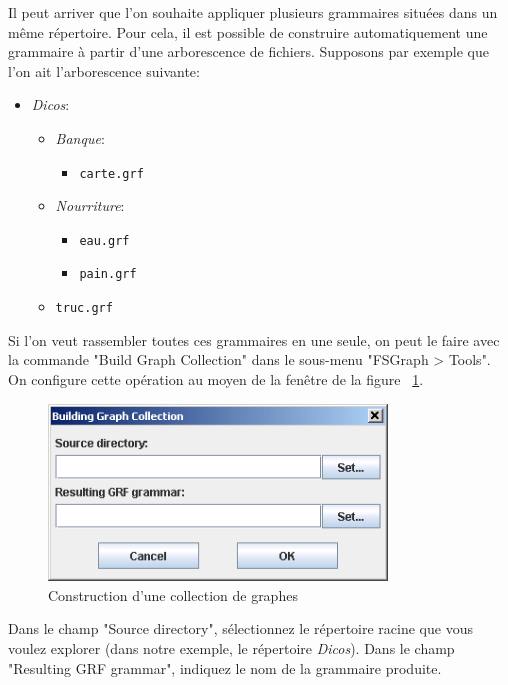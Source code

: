Il peut arriver que l’on souhaite appliquer plusieurs grammaires situées dans un même
répertoire. Pour cela, il est possible de construire automatiquement une grammaire à partir
d’une arborescence de fichiers. Supposons par exemple que l’on ait l’arborescence suivante:


\begin{itemize}
  \item \textit{Dicos}:
  \begin{itemize}
    \item \textit{Banque}:
    \begin{itemize}
      \item \texttt{carte.grf}
    \end{itemize}
    \item \textit{Nourriture}:
    \begin{itemize}
      \item \texttt{eau.grf}
      \item \texttt{pain.grf}
    \end{itemize}
    \item \texttt{truc.grf}
  \end{itemize}
\end{itemize}

\noindent Si l’on veut rassembler toutes ces grammaires en une seule, on peut le faire avec la
commande "Build Graph Collection" dans le sous-menu "FSGraph > Tools". On configure cette
opération au moyen de la fenêtre de la figure
~\ref{fig-build-graph-collection}.

\begin{figure}[!ht]
\begin{center}
\includegraphics[width=9cm]{resources/img/fig6-20.png}
\caption{Construction d’une collection de graphes\label{fig-build-graph-collection}}
\end{center}
\end{figure}

\noindent Dans le champ "Source directory", sélectionnez le répertoire racine que vous voulez
explorer (dans notre exemple, le répertoire \textit{Dicos}).  Dans le champ "Resulting GRF grammar",
indiquez le nom de la grammaire produite.


